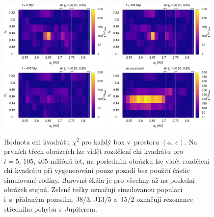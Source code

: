 \documentclass[A4paper, 12pt, oneside, openany]{book}
\begin{document}
\immediate{}
\immediate{}
\immediate{}
\immediate{}
\begin{figure}
	\centering
	\includegraphics[width=0.49\textwidth]{obr/ae_chi_0006t.png}
	\includegraphics[width=0.49\textwidth]{obr/ae_chi_0106t.png}\\
	\includegraphics[width=0.49\textwidth]{obr/ae_chi_0406t.png}
	\includegraphics[width=0.49\textwidth]{obr/ae_chi_emptyt.png}
	\caption{Hodnota chi kvadrátu $\chi^2$ pro každý box v~prostoru $(a,\,e)$. Na prvních třech obrázcích lze vidět rozdělení chi kvadrátu pro $t=5,\,105,\,405$ miliónů let, na posledním obrázku lze vidět rozdělení chi kvadrátu při vygenerování pouze pozadí bez použití částic simulované rodiny. Barevná škála je pro všechny až na poslední obrázek stejná. Zelené tečky označují simulovanou populaci i~s~přidaným pozadím. J8/3, J13/5 a~J5/2 označují rezonance středního pohybu s~Jupiterem.} \label{fig:ae_chi2}
\end{figure}
\end{document}
